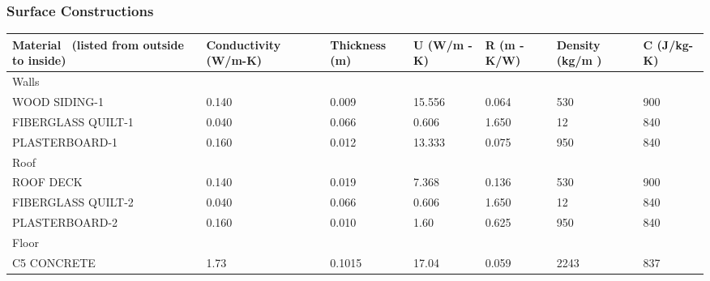 \subsubsection{Surface Constructions}\label{surface-constructions}

\begin{longtable}[c]{p{0.85in}p{0.85in}p{0.85in}p{0.85in}p{0.85in}p{0.85in}p{0.85in}}
\toprule 
Material~ (listed from outside to inside) & Conductivity (W/m-K) & Thickness (m) & U (W/m  -K) & R (m  -K/W) & Density (kg/m  ) & C   (J/kg-K) \tabularnewline \midrule
\endhead
Walls & ~ & ~ & ~ & ~ & ~ & ~ \tabularnewline
WOOD SIDING-1 & 0.140 & 0.009 & 15.556 & 0.064 & 530 & 900 \tabularnewline
FIBERGLASS QUILT-1 & 0.040 & 0.066 & 0.606 & 1.650 & 12 & 840 \tabularnewline
PLASTERBOARD-1 & 0.160 & 0.012 & 13.333 & 0.075 & 950 & 840 \tabularnewline
Roof & ~ & ~ & ~ & ~ & ~ & ~ \tabularnewline
ROOF DECK & 0.140 & 0.019 & 7.368 & 0.136 & 530 & 900 \tabularnewline
FIBERGLASS QUILT-2 & 0.040 & 0.066 & 0.606 & 1.650 & 12 & 840 \tabularnewline
PLASTERBOARD-2 & 0.160 & 0.010 & 1.60 & 0.625 & 950 & 840 \tabularnewline
Floor & ~ & ~ & ~ & ~ & ~ & ~ \tabularnewline
C5 CONCRETE & 1.73 & 0.1015 & 17.04 & 0.059 & 2243 & 837 \tabularnewline
\bottomrule
\end{longtable}
